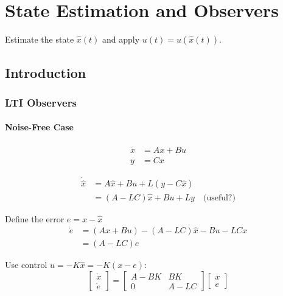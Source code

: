 \section{State Estimation and Observers}

Estimate the state $\hat{x}(t)$ and apply $u(t) = u(\hat{x}(t))$.

\subsection{Introduction}
\subsubsection{LTI Observers}
\paragraph{Noise-Free Case}
\begin{align*}
    \dot{x} & = Ax + Bu \\
    y       & = Cx
\end{align*}

\newpar{}
\begin{align*}
    \dot{\hat{x}} & = A\hat{x} + Bu + L(y - C\hat{x})                  \\
                  & = (A - LC)\hat{x} + Bu + Ly \quad \text{(useful?)}
\end{align*}

\newpar{}

Define the error $e = x - \hat{x}$
\begin{align*}
    \dot{e} & = (Ax + Bu) - (A - LC)\hat{x} - Bu - LCx \\
            & = (A - LC)e
\end{align*}

\newpar{}

Use control $u = -K\hat{x} = -K(x - e)$:
\begin{equation*}
    \begin{bmatrix}
        \dot{x} \\
        \dot{e}
    \end{bmatrix}
    =
    \begin{bmatrix}
        A - BK & BK     \\
        0      & A - LC
    \end{bmatrix}
    \begin{bmatrix}
        x \\
        e
    \end{bmatrix}
\end{equation*}

